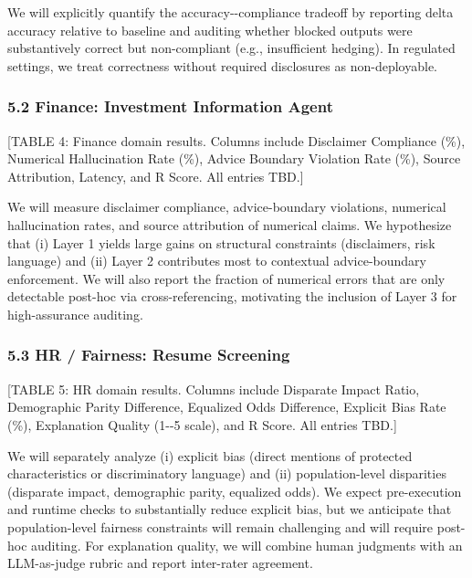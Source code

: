 \documentclass[
]{article}
\begin{document}
We will explicitly quantify the accuracy-\/-compliance tradeoff by reporting delta accuracy relative to baseline and auditing whether blocked outputs were substantively correct but non-compliant (e.g., insufficient hedging). In regulated settings, we treat correctness without required disclosures as non-deployable.

\hypertarget{52-finance-investment-information-agent}{%
\subsubsection{5.2 Finance: Investment Information Agent}\label{52-finance-investment-information-agent}}

{[}TABLE 4: Finance domain results. Columns include Disclaimer Compliance (\%), Numerical Hallucination Rate (\%), Advice Boundary Violation Rate (\%), Source Attribution, Latency, and R Score. All entries TBD.{]}

We will measure disclaimer compliance, advice-boundary violations, numerical hallucination rates, and source attribution of numerical claims. We hypothesize that (i) Layer 1 yields large gains on structural constraints (disclaimers, risk language) and (ii) Layer 2 contributes most to contextual advice-boundary enforcement. We will also report the fraction of numerical errors that are only detectable post-hoc via cross-referencing, motivating the inclusion of Layer 3 for high-assurance auditing.

\hypertarget{53-hr--fairness-resume-screening}{%
\subsubsection{5.3 HR / Fairness: Resume Screening}\label{53-hr--fairness-resume-screening}}

{[}TABLE 5: HR domain results. Columns include Disparate Impact Ratio, Demographic Parity Difference, Equalized Odds Difference, Explicit Bias Rate (\%), Explanation Quality (1-\/-5 scale), and R Score. All entries TBD.{]}

We will separately analyze (i) explicit bias (direct mentions of protected characteristics or discriminatory language) and (ii) population-level disparities (disparate impact, demographic parity, equalized odds). We expect pre-execution and runtime checks to substantially reduce explicit bias, but we anticipate that population-level fairness constraints will remain challenging and will require post-hoc auditing. For explanation quality, we will combine human judgments with an LLM-as-judge rubric and report inter-rater agreement.
\end{document}
